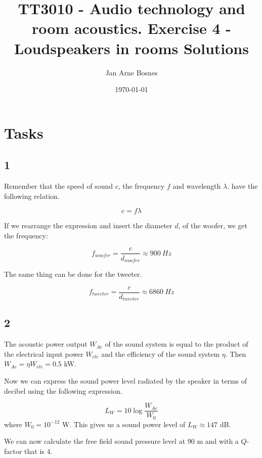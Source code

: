 \documentclass{article}
\title{TT3010 - Audio technology and room acoustics. \newline Exercise 4 - Loudspeakers in rooms \newline Solutions}
\author{Jan Arne Bosnes}
\date{\today}
\begin{document}
\maketitle

\section*{Tasks}

\subsection*{1}

Remember that the speed of sound $c$,  the frequency $f$ and wavelength $\lambda$. have the following relation.

\begin{equation}
    c=f \lambda
\end{equation}

If we rearrange the expression and insert the diameter $d$, of the woofer, we get the frequency:

\begin{equation}
    f_{woofer}=\frac{c}{d_{woofer}} \approx 900 \ Hz
\end{equation}

The same thing can be done for the tweeter.

\begin{equation}
    f_{tweeter} = \frac{c}{d_{tweeter}} \approx 6860 \ Hz
\end{equation}

\subsection*{2}

The acoustic power output $W_{Ac}$ of the sound system is equal to the product of the electrical input power $W_{ele}$ and the efficiency of the sound system $\eta$. Then $W_{Ac}=\eta W_{ele}=0.5$ kW.

Now we can express the sound power level radiated by the speaker in terms of decibel using the following expression.

\begin{equation}
    L_W = 10 \log{\frac{W_{Ac}}{W_0}}
\end{equation}
where $W_0 = 10^{-12}$ W. This gives us a sound power level of $L_W \approx 147 $ dB.

We can now calculate the free field sound pressure level at 90 m and with a $Q$-factor that is 4.
\end{document}
